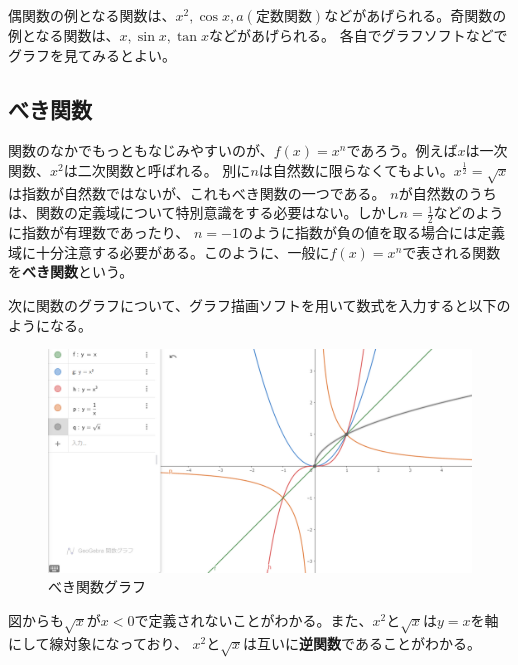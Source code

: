 \documentclass[a4j,dvipdfmx]{jsarticle}
\begin{document}
                偶関数の例となる関数は、$x^2,\cos x,a(\text{定数関数})$などがあげられる。奇関数の例となる関数は、$x,\sin x,\tan x$などがあげられる。
                各自でグラフソフトなどでグラフを見てみるとよい。
            \clearpage
            \subsection{べき関数}
                関数のなかでもっともなじみやすいのが、$f(x)=x^n$であろう。例えば$x$は一次関数、$x^2$は二次関数と呼ばれる。
                別に$n$は自然数に限らなくてもよい。$x^{\frac{1}{2}}=\sqrt{x}$は指数が自然数ではないが、これもべき関数の一つである。
                $n$が自然数のうちは、関数の定義域について特別意識をする必要はない。しかし$n=\frac{1}{2}$などのように指数が有理数であったり、
                $n=-1$のように指数が負の値を取る場合には定義域に十分注意する必要がある。このように、一般に$f(x)=x^n$で表される関数を\textbf{べき関数}という。

                次に関数のグラフについて、グラフ描画ソフトを用いて数式を入力すると以下のようになる。
                \begin{figure}[h]
                    \centering
                    \includegraphics[keepaspectratio,scale=0.5]{img/QuuNote/PowerFuncGraph.png}
                    \caption{べき関数グラフ}
                \end{figure}

                図からも$\sqrt{x}$が$x<0$で定義されないことがわかる。また、$x^2$と$\sqrt{x}$は$y=x$を軸にして線対象になっており、
                $x^2$と$\sqrt{x}$は互いに\textbf{逆関数}であることがわかる。
            \clearpage
\end{document}
